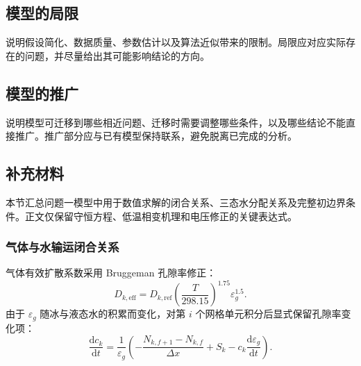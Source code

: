 \documentclass{gmcmthesis}
\begin{document}
\subsection{模型的局限}
说明假设简化、数据质量、参数估计以及算法近似带来的限制。局限应对应实际存在的问题，并尽量给出其可能影响结论的方向。

\subsection{模型的推广}
说明模型可迁移到哪些相近问题、迁移时需要调整哪些条件，以及哪些结论不能直接推广。推广部分应与已有模型保持联系，避免脱离已完成的分析。




\appendix

\subsection{补充材料}
\label{app:p1-details}

本节汇总问题一模型中用于数值求解的闭合关系、三态水分配关系及完整初边界条件。正文仅保留守恒方程、低温相变机理和电压修正的关键表达式。

\subsubsection{气体与水输运闭合关系}

气体有效扩散系数采用 Bruggeman 孔隙率修正：
\begin{equation}
  D_{k,\mathrm{eff}}=D_{k,\mathrm{ref}}\left(\frac{T}{298.15}\right)^{1.75}\varepsilon_g^{1.5}.
  \label{eq:dkeff}
\end{equation}
由于 $\varepsilon_g$ 随冰与液态水的积累而变化，对第 $i$ 个网格单元积分后显式保留孔隙率变化项：
\begin{equation}
  \frac{\mathrm{d}c_k}{\mathrm{d}t}
  =\frac{1}{\varepsilon_g}\left(-\frac{N_{k,f+1}-N_{k,f}}{\Delta x}+S_k-c_k\frac{\mathrm{d}\varepsilon_g}{\mathrm{d}t}\right).
  \label{eq:gasdisc}
\end{equation}
\end{document}
